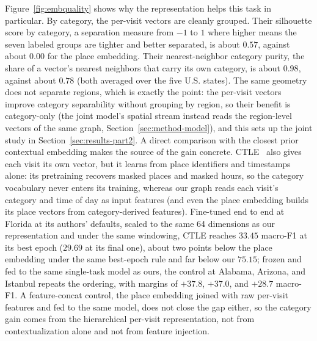 Figure~\ref{fig:embquality} shows why the representation helps this task in
particular. By category, the per-visit vectors are cleanly grouped. Their
silhouette score by category, a separation measure from $-1$ to $1$ where
higher means the seven labeled groups are tighter and better separated, is about $0.57$, against about
$0.00$ for the place embedding. Their nearest-neighbor category purity, the share of a vector's nearest
neighbors that carry its own category, is about $0.98$, against about $0.78$
(both averaged over the five U.S. states). The same geometry does not separate regions, which is exactly the point: the
per-visit vectors improve category separability without grouping by region, so
their benefit is category-only (the joint model's spatial stream instead reads
the region-level vectors of the same graph, Section~\ref{sec:method-model}),
and this sets up the joint study in Section~\ref{sec:results-part2}. A direct comparison with the closest prior
contextual embedding makes the source of the gain concrete.
CTLE~\cite{lin2021ctle} also gives each visit its own vector, but it learns
from place identifiers and timestamps alone: its pretraining recovers masked
places and masked hours, so the category vocabulary never enters its training,
whereas our graph reads each visit's category and time of day as input features
(and even the place embedding builds its place vectors from category-derived
features). Fine-tuned end to end at Florida at its authors' defaults, scaled to
the same 64 dimensions as our representation and under the same windowing,
CTLE reaches $33.45$ macro-F1 at its best epoch ($29.69$ at its final one),
about two points below the place embedding under the same best-epoch
rule and far below our $75.15$; frozen and fed to the same single-task model as
ours, the control at Alabama, Arizona, and Istanbul repeats the ordering,
with margins of $+37.8$, $+37.0$, and $+28.7$ macro-F1. A feature-concat control,
the place embedding joined with raw per-visit features and fed to the same model,
does not close the gap either, so the category gain comes from the hierarchical
per-visit representation, not from contextualization alone and not from feature
injection.


